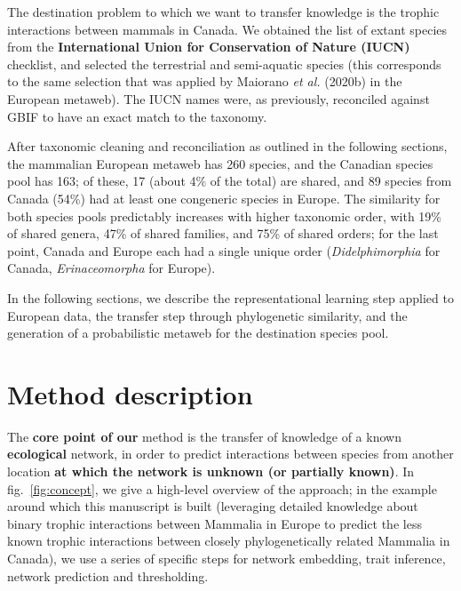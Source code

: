 \documentclass[11pt]{article}
\makeatletter
\def\maxwidth{\ifdim\Gin@nat@width>\linewidth\linewidth
\else\Gin@nat@width\fi}
\let\Oldincludegraphics\includegraphics
\renewcommand{\includegraphics}[1]{\Oldincludegraphics[width=\maxwidth]{#1}}
\providecommand{\DIFaddtex}[1]{{\bf #1}} %
\providecommand{\DIFdeltex}[1]{} %
\providecommand{\DIFaddbegin}{\protect\color{blue}} %
\providecommand{\DIFaddend}{\protect\color{black}} %
\providecommand{\DIFdelbegin}{\protect\color{red}} %
\providecommand{\DIFdelend}{\protect\color{black}} %
\providecommand{\DIFadd}[1]{\texorpdfstring{\DIFaddtex{#1}}{#1}} %
\providecommand{\DIFdel}[1]{\texorpdfstring{\DIFdeltex{#1}}{}} %
\newcommand{\DIFscaledelfig}{0.5}
\newlength{\DIFdelgraphicswidth} %
\newlength{\DIFdelgraphicsheight} %
\newcommand{\DIFaddincludegraphics}[2][]{{\color{blue}\fbox{\DIFOincludegraphics[#1]{#2}}}} %
\newcommand{\DIFdelincludegraphics}[2][]{%
\sbox{\DIFdelgraphicsbox}{\DIFOincludegraphics[#1]{#2}}%
\settoboxwidth{\DIFdelgraphicswidth}{\DIFdelgraphicsbox} %
\settoboxtotalheight{\DIFdelgraphicsheight}{\DIFdelgraphicsbox} %
\scalebox{\DIFscaledelfig}{%
\parbox[b]{\DIFdelgraphicswidth}{\usebox{\DIFdelgraphicsbox}\\[-\baselineskip] \rule{\DIFdelgraphicswidth}{0em}}\llap{\resizebox{\DIFdelgraphicswidth}{\DIFdelgraphicsheight}{%
\setlength{\unitlength}{\DIFdelgraphicswidth}%
\begin{picture}(1,1)%
\thicklines\linethickness{2pt} %
{\color[rgb]{1,0,0}\put(0,0){\framebox(1,1){}}}%
{\color[rgb]{1,0,0}\put(0,0){\line( 1,1){1}}}%
{\color[rgb]{1,0,0}\put(0,1){\line(1,-1){1}}}%
\end{picture}%
}\hspace*{3pt}}} %
} %
\DeclareRobustCommand{\DIFaddbegin}{\DIFOaddbegin \let\includegraphics\DIFaddincludegraphics} %
\DeclareRobustCommand{\DIFaddend}{\DIFOaddend \let\includegraphics\DIFOincludegraphics} %
\DeclareRobustCommand{\DIFdelbegin}{\DIFOdelbegin \let\includegraphics\DIFdelincludegraphics} %
\DeclareRobustCommand{\DIFdelend}{\DIFOaddend \let\includegraphics\DIFOincludegraphics} %
\makeatother
\begin{document}
The destination problem to which we want to transfer knowledge is the
trophic interactions between mammals in Canada. We obtained the list of
extant species from the \DIFdelbegin \DIFdel{IUCN }\DIFdelend \DIFaddbegin \DIFadd{International Union for Conservation of Nature
(IUCN) }\DIFaddend checklist, and selected the terrestrial and semi-aquatic species
(this corresponds to the same selection that was applied by Maiorano
\emph{et al.} (2020b) in the European metaweb). The IUCN names were, as
previously, reconciled against GBIF to have an exact match to the
taxonomy.

After taxonomic cleaning and reconciliation as outlined in the following
sections, the mammalian European metaweb has 260 species, and the
Canadian species pool has 163; of these, 17 (about 4\% of the total) are
shared, and 89 species from Canada (54\%) had at least one congeneric
species in Europe. The similarity for both species pools predictably
increases with higher taxonomic order, with 19\% of shared genera, 47\%
of shared families, and 75\% of shared orders; for the last point,
Canada and Europe each had a single unique order (\emph{Didelphimorphia}
for Canada, \emph{Erinaceomorpha} for Europe).

In the following sections, we describe the representational learning
step applied to European data, the transfer step through phylogenetic
similarity, and the generation of a probabilistic metaweb for the
destination species pool.

\hypertarget{method-description}{%
\section{Method description}\label{method-description}}

The \DIFdelbegin \DIFdel{crux of the }\DIFdelend \DIFaddbegin \DIFadd{core point of our }\DIFaddend method is the transfer of knowledge of a known
\DIFaddbegin \DIFadd{ecological }\DIFaddend network, in order to predict interactions between species
from another location \DIFaddbegin \DIFadd{at which the network is unknown (or partially
known)}\DIFaddend . In fig.~\ref{fig:concept}, we give a high-level overview of the
approach; in the example around which this manuscript is built
(leveraging detailed knowledge about binary trophic interactions between
Mammalia in Europe to predict the less known trophic interactions
between closely phylogenetically related Mammalia in Canada), we use a
series of specific steps for network embedding, trait inference, network
prediction and thresholding.
\end{document}
